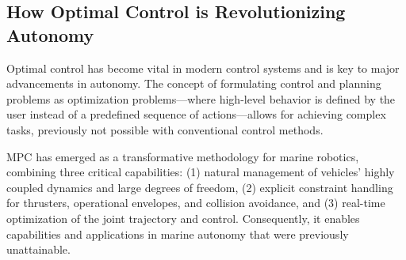 \subsection{How Optimal Control is Revolutionizing Autonomy}

Optimal control has become vital in modern control systems and is key to major advancements in autonomy. The concept of formulating control and planning problems as optimization problems—where high-level behavior is defined by the user instead of a predefined sequence of actions—allows for achieving complex tasks, previously not possible with conventional control methods. 

\ac{MPC} has emerged as a transformative methodology for marine robotics, combining three critical capabilities: (1) natural management of vehicles' highly coupled dynamics and large degrees of freedom, (2) explicit constraint handling for thrusters, operational envelopes, and collision avoidance, and (3) real-time optimization of the joint trajectory and control. Consequently, it enables capabilities and applications in marine autonomy that were previously unattainable.



    

    
    

    